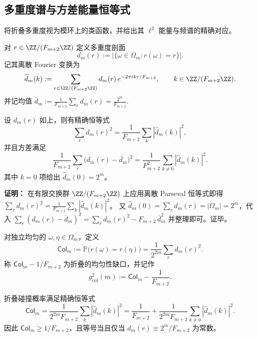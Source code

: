\subsection{多重度谱与方差能量恒等式}
将折叠多重度视为模环上的类函数，并给出其 $\ell^2$ 能量与频谱的精确对应。

\begin{definition}[多重度谱]
对 $r\in\ZZ/(F_{m+2}\ZZ)$ 定义多重度剖面
\[
d_m(r):=\bigl|\{\omega\in\Omega_m:r(\omega)=r\}\bigr|.
\]
记其离散 Fourier 变换为
\[
\widehat d_m(k):=\sum_{r\in\ZZ/(F_{m+2}\ZZ)} d_m(r)\,e^{-2\pi i kr/F_{m+2}},
\qquad k\in\ZZ/(F_{m+2}\ZZ).
\]
并记均值
\(
\overline d_m:=\frac{1}{F_{m+2}}\sum_r d_m(r)=\frac{2^m}{F_{m+2}}.
\)
\end{definition}

\begin{theorem}[多重度能量与方差的谱表示]
\label{thm:fold-multiplicity-energy}
设 $d_m(r)$ 如上，则有精确恒等式
\[
\sum_{r} d_m(r)^2=\frac{1}{F_{m+2}}\sum_{k}|\widehat d_m(k)|^2,
\]
并且方差满足
\[
\frac{1}{F_{m+2}}\sum_r\bigl(d_m(r)-\overline d_m\bigr)^2
=\frac{1}{F_{m+2}^2}\sum_{k\ne 0}|\widehat d_m(k)|^2.
\]
其中 $k=0$ 项给出 $\widehat d_m(0)=2^m$。
\end{theorem}

\textbf{证明：}
在有限交换群 $\ZZ/(F_{m+2}\ZZ)$ 上应用离散 Parseval 恒等式即得
\(
\sum_r d_m(r)^2=\frac{1}{F_{m+2}}\sum_k|\widehat d_m(k)|^2
\)。
又 $\widehat d_m(0)=\sum_r d_m(r)=|\Omega_m|=2^m$，代入
\(
\sum_r(d_m(r)-\overline d_m)^2=\sum_r d_m(r)^2-F_{m+2}\,\overline d_m^2
\)
并整理即可。证毕。

\begin{definition}[折叠碰撞概率]
对独立均匀的 $\omega,\eta\in\Omega_m$，定义
\[
\mathsf{Col}_m:=\mathbb{P}\bigl(r(\omega)=r(\eta)\bigr)
=\frac{1}{2^{2m}}\sum_r d_m(r)^2.
\]
称 $\mathsf{Col}_m-1/F_{m+2}$ 为折叠的均匀性缺口，并记作
\[
g_{\mathrm{col}}^2(m):=\mathsf{Col}_m-\frac{1}{F_{m+2}}.
\]
\end{definition}

\begin{theorem}[碰撞概率的谱恒等式]
\label{thm:fold-collision-spectrum}
折叠碰撞概率满足精确恒等式
\[
\mathsf{Col}_m
=\frac{1}{2^{2m}F_{m+2}}\sum_{k}|\widehat d_m(k)|^2
=\frac{1}{F_{m+2}}+\frac{1}{2^{2m}F_{m+2}}\sum_{k\ne 0}|\widehat d_m(k)|^2.
\]
因此 $\mathsf{Col}_m\ge 1/F_{m+2}$，且等号当且仅当 $d_m(r)\equiv 2^m/F_{m+2}$ 为常数。
\end{theorem}

